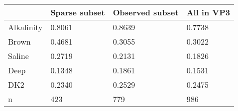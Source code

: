 \begin{tabular}{llll}
\toprule
 & Sparse subset & Observed subset & All in VP3 \\
\midrule
Alkalinity & 0.8061 & 0.8639 & 0.7738 \\
Brown & 0.4681 & 0.3055 & 0.3022 \\
Saline & 0.2719 & 0.2131 & 0.1826 \\
Deep & 0.1348 & 0.1861 & 0.1531 \\
DK2 & 0.2340 & 0.2529 & 0.2475 \\
n & 423 & 779 & 986 \\
\bottomrule
\end{tabular}

